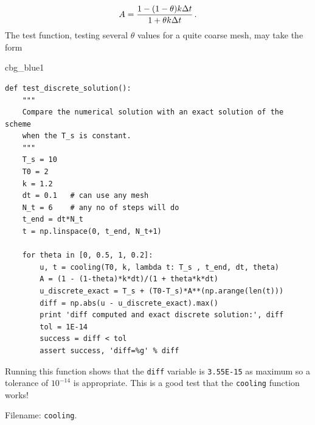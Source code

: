 \documentclass[%
oneside,                 %
final,                   %
10pt]{article}
\newenvironment{_cod_tight}[1]{
   \def\FrameCommand{\colorbox{#1}}
   \FrameRule0.6pt\MakeFramed {\FrameRestore}\vskip3mm}
   {\vskip0mm\endMakeFramed}
\newenvironment{cod}[1]{
\bgroup\rmfamily
\fboxsep=0mm\relax
\begin{_cod_tight}{#1}
\list{}{\parsep=-2mm\parskip=0mm\topsep=0pt\leftmargin=2mm
\rightmargin=2\leftmargin\leftmargin=4pt\relax}
\item\relax}
{\endlist\end{_cod_tight}\egroup}
\newenvironment{doconceexercise}{}{}
\begin{document}
\begin{doconceexercise}
\[ A = \frac{1 - (1-\theta) k\Delta t}{1 + \theta k\Delta t}\tp\]
The test function, testing several $\theta$ values for a quite coarse
mesh, may take the form

\begin{cod}{cbg_blue1}\begin{Verbatim}[numbers=none,fontsize=\fontsize{9pt}{9pt},baselinestretch=0.95,xleftmargin=2mm]
def test_discrete_solution():
    """
    Compare the numerical solution with an exact solution of the scheme
    when the T_s is constant.
    """
    T_s = 10
    T0 = 2
    k = 1.2
    dt = 0.1   # can use any mesh
    N_t = 6    # any no of steps will do
    t_end = dt*N_t
    t = np.linspace(0, t_end, N_t+1)

    for theta in [0, 0.5, 1, 0.2]:
        u, t = cooling(T0, k, lambda t: T_s , t_end, dt, theta)
        A = (1 - (1-theta)*k*dt)/(1 + theta*k*dt)
        u_discrete_exact = T_s + (T0-T_s)*A**(np.arange(len(t)))
        diff = np.abs(u - u_discrete_exact).max()
        print 'diff computed and exact discrete solution:', diff
        tol = 1E-14
        success = diff < tol
        assert success, 'diff=%g' % diff
\end{Verbatim}
\end{cod}
\noindent
Running this function shows that the \texttt{diff} variable is \texttt{3.55E-15}
as maximum so a tolerance of $10^{-14}$ is appropriate.
This is a good test that the \texttt{cooling} function works!


\noindent Filename: \texttt{cooling}.

\end{doconceexercise}
\end{document}
